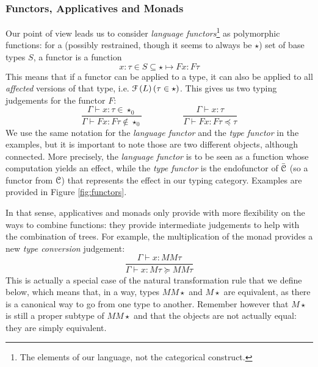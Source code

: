 \subsubsection{Functors, Applicatives and Monads}
\label{subsubsec:functors}
Our point of view leads us to consider \emph{language functors}\footnote{The
	elements of our language, not the categorical construct.} as polymorphic
functions: for a (possibly restrained, though it seems to always be $\star$)
set of base types $S$, a functor is a function
\begin{equation*}
	x: \tau\in S\subseteq \star \mapsto F x: F\tau
\end{equation*}
This means that if a functor can be applied to a type, it can also be applied
to all \emph{affected} versions of that type, i.e.
$\mathcal{F}\left( L \right)(\tau\in \star)$.
This gives us two typing judgements for the functor $F$:
\begin{equation*}
	\frac{\Gamma\vdash x: \tau \in \star_{0}}{\Gamma\vdash F x: F\tau \notin
		\star_{0}} \hspace{2cm} \frac{\Gamma\vdash x:
		\tau}{\Gamma\vdash Fx : F\tau\preceq \tau}
\end{equation*}
We use the same notation for the \emph{language functor} and the
\emph{type functor} in the examples, but it is important to note those are two
different objects, although connected.
More precisely, the \emph{language functor} is to be seen as a function whose
computation yields an effect, while the \emph{type functor} is the endofunctor
of $\bar{\mathcal{C}}$ (so a functor from $\mathcal{C}$) that represents the effect in our
typing category.
Examples are provided in Figure \ref{fig:functors}.

\smallskip

In that sense, applicatives and monads only provide with more flexibility on
the ways to combine functions:
they provide intermediate judgements to help with the combination of trees.
For example, the multiplication of the monad provides a new
\emph{type conversion} judgement:
\begin{equation*}
	\frac{\Gamma\vdash x: MM\tau}{\Gamma\vdash x: M\tau \succeq MM\tau}
\end{equation*}
This is actually a special case of the natural transformation rule that we
define below, which means that, in a way, types $MM\star$ and $M\star$ are
equivalent, as there is a canonical way to go from one type to another.
Remember however that $M\star$ is still a proper subtype of $MM\star$ and that
the objects are not actually equal: they are simply equivalent.

